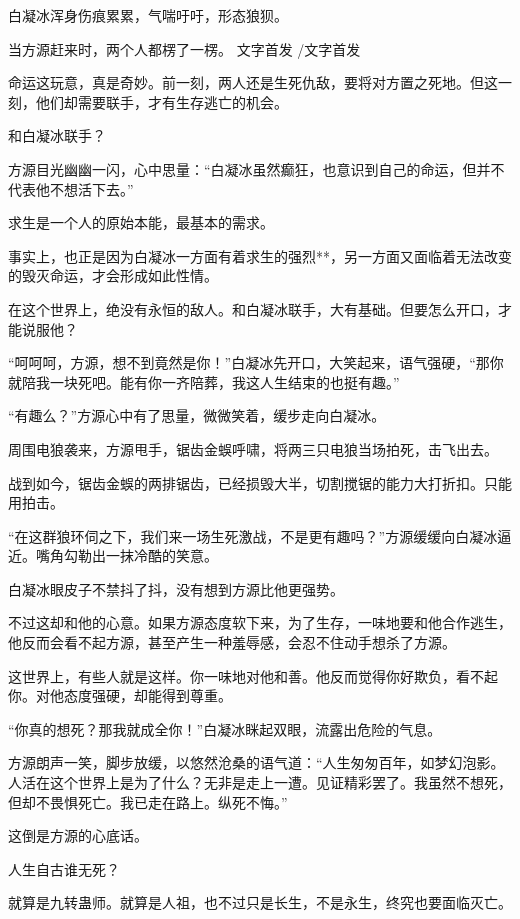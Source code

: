 
\begin{this_body}

白凝冰浑身伤痕累累，气喘吁吁，形态狼狈。

当方源赶来时，两个人都楞了一楞。 文字首发 /文字首发

命运这玩意，真是奇妙。前一刻，两人还是生死仇敌，要将对方置之死地。但这一刻，他们却需要联手，才有生存逃亡的机会。

和白凝冰联手？

方源目光幽幽一闪，心中思量：“白凝冰虽然癫狂，也意识到自己的命运，但并不代表他不想活下去。”

求生是一个人的原始本能，最基本的需求。

事实上，也正是因为白凝冰一方面有着求生的强烈**，另一方面又面临着无法改变的毁灭命运，才会形成如此性情。

在这个世界上，绝没有永恒的敌人。和白凝冰联手，大有基础。但要怎么开口，才能说服他？

“呵呵呵，方源，想不到竟然是你！”白凝冰先开口，大笑起来，语气强硬，“那你就陪我一块死吧。能有你一齐陪葬，我这人生结束的也挺有趣。”

“有趣么？”方源心中有了思量，微微笑着，缓步走向白凝冰。

周围电狼袭来，方源甩手，锯齿金蜈呼啸，将两三只电狼当场拍死，击飞出去。

战到如今，锯齿金蜈的两排锯齿，已经损毁大半，切割搅锯的能力大打折扣。只能用拍击。

“在这群狼环伺之下，我们来一场生死激战，不是更有趣吗？”方源缓缓向白凝冰逼近。嘴角勾勒出一抹冷酷的笑意。

白凝冰眼皮子不禁抖了抖，没有想到方源比他更强势。

不过这却和他的心意。如果方源态度软下来，为了生存，一味地要和他合作逃生，他反而会看不起方源，甚至产生一种羞辱感，会忍不住动手想杀了方源。

这世界上，有些人就是这样。你一味地对他和善。他反而觉得你好欺负，看不起你。对他态度强硬，却能得到尊重。

“你真的想死？那我就成全你！”白凝冰眯起双眼，流露出危险的气息。

方源朗声一笑，脚步放缓，以悠然沧桑的语气道：“人生匆匆百年，如梦幻泡影。人活在这个世界上是为了什么？无非是走上一遭。见证精彩罢了。我虽然不想死，但却不畏惧死亡。我已走在路上。纵死不悔。”

这倒是方源的心底话。

人生自古谁无死？

就算是九转蛊师。就算是人祖，也不过只是长生，不是永生，终究也要面临灭亡。


\end{this_body}
